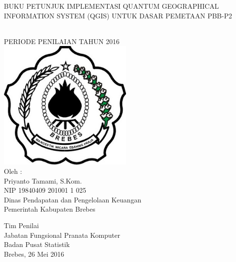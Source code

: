 \begin{titlepage}

\begin{center}
{\large BUKU PETUNJUK IMPLEMENTASI QUANTUM GEOGRAPHICAL INFORMATION SYSTEM (QGIS) UNTUK DASAR PEMETAAN PBB-P2}

\HRule\\[1cm]

PERIODE PENILAIAN TAHUN 2016\\[1cm]

\includegraphics[width=0.5\textwidth]{./resources/logo}\\[1cm]

Oleh :\\
Priyanto Tamami, S.Kom.\\
NIP 19840409 201001 1 025\\
Dinas Pendapatan dan Pengelolaan Keuangan\\
Pemerintah Kabupaten Brebes\\[1cm]

\vfill

Tim Penilai\\
Jabatan Fungsional Pranata Komputer\\
Badan Pusat Statistik\\
Brebes, 26 Mei 2016
\end{center}

\end{titlepage}